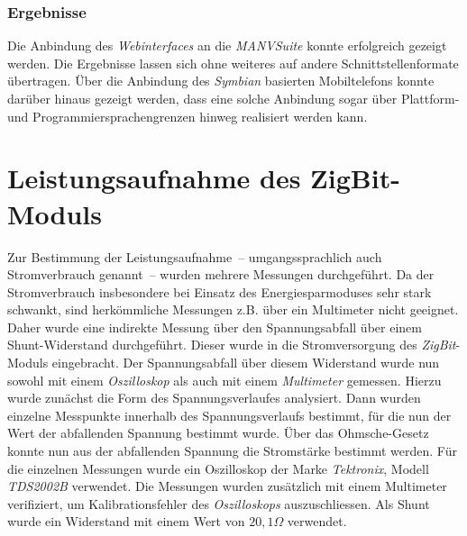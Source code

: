 \subsubsection{Ergebnisse}
Die Anbindung des \emph{Webinterfaces} an die \emph{MANVSuite} konnte erfolgreich gezeigt werden. Die
Ergebnisse lassen sich ohne weiteres auf andere Schnittstellenformate übertragen. Über die Anbindung
des \emph{Symbian} basierten Mobiltelefons konnte darüber hinaus gezeigt werden, dass eine solche
Anbindung sogar über Plattform- und Programmiersprachengrenzen hinweg realisiert werden kann. 

\section{Leistungsaufnahme des ZigBit-Moduls}
\label{ergebnis_normal}
Zur Bestimmung der Leistungsaufnahme~-- umgangssprachlich auch Strom\-ver\-brauch genannt~-- wurden mehrere Messungen 
durchgeführt.
Da der Stromverbrauch insbesondere bei Einsatz des Energiesparmoduses sehr stark schwankt, sind herkömmliche Messungen
z.B. über ein Multimeter nicht geeignet. Daher wurde eine indirekte Messung über den Spannungsabfall über einem 
Shunt-Wi\-der\-stand durchgeführt. Dieser wurde in die Stromversorgung des \emph{ZigBit}-Moduls eingebracht. Der 
Spannungsabfall über diesem Widerstand wurde nun sowohl mit einem \emph{Oszilloskop} als auch mit einem \emph{Multimeter}
gemessen. Hierzu wurde zunächst die Form des Spannungsverlaufes analysiert. Dann wurden einzelne Messpunkte innerhalb 
des Spannungsverlaufs bestimmt, für die nun der Wert der abfallenden Spannung bestimmt wurde. Über das Ohmsche-Gesetz 
konnte nun aus der abfallenden
Spannung die Stromstärke bestimmt werden. Für die einzelnen Messungen wurde ein Oszilloskop der Marke \emph{Tektronix}, 
Modell \emph{TDS2002B} verwendet. Die Messungen wurden zusätzlich mit einem Multimeter verifiziert,
um Kalibrationsfehler des \emph{Oszilloskops} auszuschliessen. Als Shunt wurde ein Widerstand mit einem Wert von $20,1\Omega$
verwendet.

